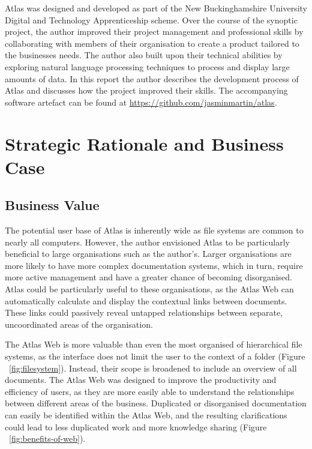 \documentclass{article}
\begin{document}
Atlas was designed and developed as part of the New Buckinghamshire University Digital and Technology Apprenticeship scheme. Over the course of the synoptic project, the author improved their project management and professional skills by collaborating with members of their organisation to create a product tailored to the businesses needs. The author also built upon their technical abilities by exploring natural language processing techniques to process and display large amounts of data. In this report the author describes the development process of Atlas and discusses how the project improved their skills. The accompanying software artefact can be found at \url{https://github.com/jasminmartin/atlas}. 


\newpage

\section{Strategic Rationale and Business Case}

\subsection{Business Value}

The potential user base of Atlas is inherently wide as file systems are common to nearly all computers. However, the author envisioned Atlas to be particularly beneficial to large organisations such as the author's. Larger organisations are more likely to have more complex documentation systems, which in turn, require more active management and have a greater chance of becoming disorganised. Atlas could be particularly useful to these organisations, as the Atlas Web can automatically calculate and display the contextual links between documents. These links could passively reveal untapped relationships between separate, uncoordinated areas of the organisation.

The Atlas Web is more valuable than even the most organised of hierarchical file systems, as the interface does not limit the user to the context of a folder (Figure ~\ref{fig:filesystem}). Instead, their scope is broadened to include an overview of all documents. The Atlas Web was designed to improve the productivity and efficiency of users, as they are more easily able to understand the relationships between different areas of the business. Duplicated or disorganised documentation can easily be identified within the Atlas Web, and the resulting clarifications could lead to less duplicated work and more knowledge sharing (Figure ~\ref{fig:benefits-of-web}).
\end{document}

